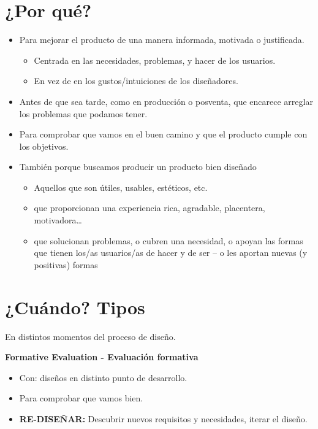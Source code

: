 \documentclass[12pt, twoside, openright]{report} %
\begin{document}
\section{¿Por qué?}
\begin{itemize}
	\item Para mejorar el producto de una manera informada, motivada o justificada.
	      \begin{itemize}
		      \item Centrada en las necesidades, problemas, y hacer de los usuarios.
		      \item En vez de en los gustos/intuiciones de los diseñadores.
	      \end{itemize}
	\item Antes de que sea tarde, como en producción o posventa, que encarece arreglar los problemas que podamos tener.
	\item Para comprobar que vamos en el buen camino y que el producto cumple con los objetivos.
	\item También porque buscamos producir un producto bien diseñado
	      \begin{itemize}
		      \item Aquellos que son útiles, usables, estéticos, etc.
		      \item que proporcionan una experiencia rica, agradable, placentera, motivadora\dots
		      \item que solucionan problemas, o cubren una necesidad, o apoyan las formas que tienen los/as usuarios/as de hacer y de ser – o les aportan nuevas (y positivas) formas
	      \end{itemize}
\end{itemize}

\section{¿Cuándo? Tipos}
En distintos momentos del proceso de diseño.

\pagebreak

\textbf{Formative Evaluation - Evaluación formativa}
\begin{itemize}
	\item Con: diseños en distinto punto de desarrollo.
	\item Para comprobar que vamos bien.
	\item \textbf{RE-DISEÑAR:} Descubrir nuevos requisitos y necesidades, iterar el diseño.
\end{itemize}
\end{document}
